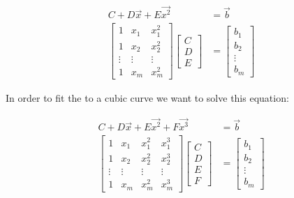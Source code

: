 \documentclass[12pt,letterpaper]{article}
\begin{document}
\begin{enumerate}
      \begin{align*}
        C + D\vec{x} + E\vec{x^2} &= \vec{b} \\
        \begin{bmatrix}
          1 & x_1 & x_1^2 \\
          1 & x_2 & x_2^2 \\
          \vdots & \vdots & \vdots \\
          1 & x_m & x_m^2
        \end{bmatrix}
        \begin{bmatrix}
          C \\
          D \\
          E
        \end{bmatrix}
        &=
        \begin{bmatrix}
          b_1 \\
          b_2 \\
          \vdots \\
          b_m
        \end{bmatrix}
      \end{align*}

      \pagebreak

      In order to fit the to a cubic curve we want to solve this equation:

      \begin{align*}
        C + D\vec{x} + E\vec{x^2} + F\vec{x^3} &= \vec{b} \\
        \begin{bmatrix}
          1 & x_1 & x_1^2 & x_1^3 \\
          1 & x_2 & x_2^2 & x_2^3 \\
          \vdots & \vdots & \vdots & \vdots \\
          1 & x_m & x_m^2 & x_m^3
        \end{bmatrix}
        \begin{bmatrix}
          C \\
          D \\
          E \\
          F
        \end{bmatrix}
        &=
        \begin{bmatrix}
          b_1 \\
          b_2 \\
          \vdots \\
          b_m
        \end{bmatrix}
      \end{align*}


\end{enumerate}
\end{document}
